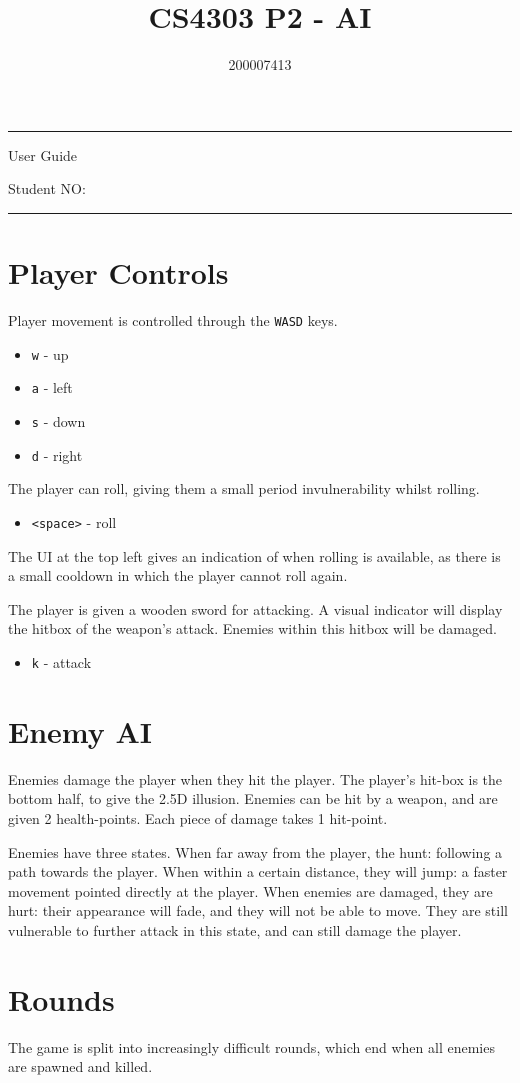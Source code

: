 \documentclass[12pt, a4paper]{article}
\title{CS4303 P2 - AI}
\author{200007413}
\begin{document}
\hrule
{\huge User Guide}

{\Huge \thetitle}

{\Large Student NO: \theauthor}

\vspace{1em}\hrule

\section{Player Controls}

Player movement is controlled through the \texttt{WASD} keys.
\begin{itemize}
\item\texttt{w} - up
\item\texttt{a} - left
\item\texttt{s} - down 
\item\texttt{d} - right 
\end{itemize}

The player can roll, giving them a small period invulnerability whilst rolling.
\begin{itemize}
\item\texttt{<space>} - roll
\end{itemize}

The UI at the top left gives an indication of when rolling is available, as there is a small cooldown in which the player cannot roll again.

The player is given a wooden sword for attacking. A visual indicator will display the hitbox of the weapon's attack. Enemies within this hitbox will be damaged.
\begin{itemize}
\item\texttt{k} - attack
\end{itemize}

\section{Enemy AI}

Enemies damage the player when they hit the player. The player's hit-box is the bottom half, to give the 2.5D illusion. Enemies can be hit by a weapon, and are given 2 health-points. Each piece of damage takes 1 hit-point.

Enemies have three states. When far away from the player, the hunt: following a path towards the player. When within a certain distance, they will jump: a faster movement pointed directly at the player. When enemies are damaged, they are hurt: their appearance will fade, and they will not be able to move. They are still vulnerable to further attack in this state, and can still damage the player.

\section{Rounds}

The game is split into increasingly difficult rounds, which end when all enemies are spawned and killed.
\end{document}
